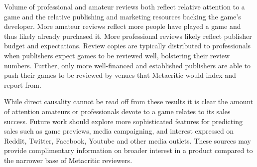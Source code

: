 \documentclass{sig-alternate}
\begin{document}


Volume of professional and amateur reviews both reflect relative attention to a game and the relative publishing and marketing resources backing the game's developer. More amateur reviews reflect more people have played a game and thus likely already purchased it.
More professional reviews likely reflect publisher budget and expectations. Review copies are typically distributed to professionals when publishers expect games to be reviewed well, bolstering their review numbers. Further, only more well-financed and established publishers are able to push their games to be reviewed by venues that Metacritic would index and report from.

While direct causality cannot be read off from these results it is clear the amount of attention amateurs or professionals devote to a game relates to its sales success. Future work should explore more sophisticated features for predicting sales such as game previews, media campaigning, and interest expressed on Reddit, Twitter, Facebook, Youtube and other media outlets. These sources may provide complimentary information on broader interest in a product compared to the narrower base of Metacritic reviewers.
\end{document}
